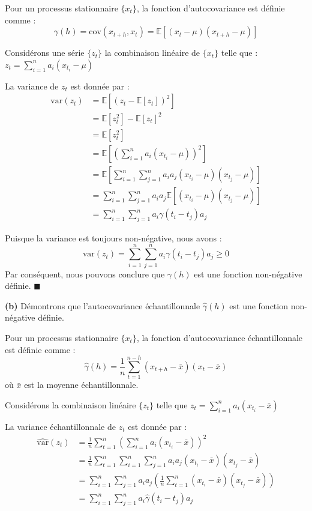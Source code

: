 \documentclass{homework}
\begin{document}
Pour un processus stationnaire $\{x_t\}$, la fonction d'autocovariance est définie comme :
\[ \gamma(h) = \text{cov}(x_{t+h},x_t) = \mathbb{E}[(x_t - \mu)(x_{t+h} - \mu)] \]

Considérons une série $\{z_t\}$ la combinaison linéaire de $\{x_t\}$ telle que : 
$ z_t = \sum_{i=1}^n a_i (x_{t_i} - \mu) $

La variance de $z_t$ est donnée par :
\begin{align*}
\text{var}(z_t) 
&= \mathbb{E}[(z_t - \mathbb{E}[z_t])^2] \\
&= \mathbb{E}[z_t^2] - \mathbb{E}[z_t]^2 \\
&= \mathbb{E}[z_t^2] \\
&= \mathbb{E}\left[\left(\sum_{i=1}^n a_i (x_{t_i} - \mu)\right)^2\right] \\
&= \mathbb{E}\left[\sum_{i=1}^n \sum_{j=1}^n a_i a_j (x_{t_i} - \mu)(x_{t_j} - \mu)\right] \\
&= \sum_{i=1}^n \sum_{j=1}^n a_i a_j \mathbb{E}[(x_{t_i} - \mu)(x_{t_j} - \mu)] \\
&= \sum_{i=1}^n \sum_{j=1}^n a_i \gamma(t_i - t_j) a_j
\end{align*}

Puisque la variance est toujours non-négative, nous avons :
\[ \text{var}(z_t) = \sum_{i=1}^n \sum_{j=1}^n a_i \gamma(t_i - t_j) a_j \geq 0 \]
Par conséquent, nous pouvons conclure que $\gamma(h)$ est une fonction non-négative définie. $\blacksquare$

\newpage
\textbf{(b)} Démontrons que l'autocovariance échantillonnale $\hat{\gamma}(h)$ est une fonction non-négative définie.

Pour un processus stationnaire $\{x_t\}$, la fonction d'autocovariance échantillonnale est définie comme :
\[ \hat{\gamma}(h) = \frac{1}{n} \sum_{t=1}^{n-h} (x_{t+h} - \bar{x})(x_t - \bar{x}) \]
où $\bar{x}$ est la moyenne échantillonnale.

Considérons la combinaison linéaire $\{z_t\}$ telle que $z_t = \sum_{i=1}^n a_i (x_{t_i} - \bar{x})$

La variance échantillonnale de $z_t$ est donnée par :
\begin{align*}
\widehat{\text{var}}(z_t) 
&=\frac{1}{n} \sum_{t=1}^n \left(\sum_{i=1}^n a_i (x_{t_i} - \bar{x})\right)^2 \\
&= \frac{1}{n} \sum_{t=1}^n \sum_{i=1}^n \sum_{j=1}^n a_i a_j (x_{t_i} - \bar{x})(x_{t_j} - \bar{x}) \\
&= \sum_{i=1}^n \sum_{j=1}^n a_i a_j \left(\frac{1}{n} \sum_{t=1}^n (x_{t_i} - \bar{x})(x_{t_j} - \bar{x})\right) \\
&= \sum_{i=1}^n \sum_{j=1}^n a_i \hat{\gamma}(t_i - t_j) a_j
   \end{align*}
\end{document}
